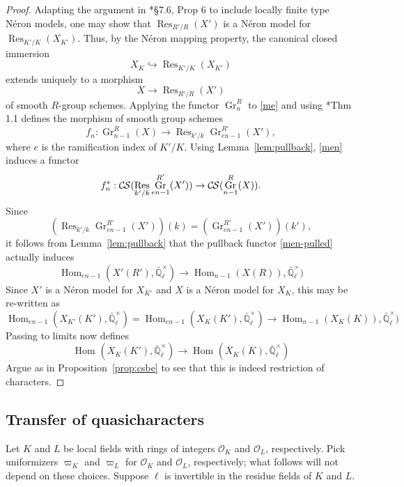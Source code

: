 \documentclass[10pt]{amsart}
\theoremstyle{plain}
\theoremstyle{definition}
\newcommand{\EE}{\mathbb{\bar Q}_\ell}
\newcommand{\OK}{\mathcal{O}_K}
\newcommand{\OL}{\mathcal{O}_L}
\newcommand{\Fq}{k}
\newcommand{\EEx}{\EE^\times}
\DeclareMathOperator{\Hom}{Hom}
\DeclareMathOperator{\Gr}{Gr}
\DeclareMathOperator{\Res}{Res}
\newcommand{\CS}{{\mathcal{C\hskip-0.8pt S}}}
\begin{document}
\begin{proof}
Adapting the argument in \cite{bosch-lutkebohmert-reynaud:NeronModels}*{\S 7.6, Prop 6} to include locally finite type N\'eron models,
one may show that $\Res_{R'/R}(X')$ is a N\'eron model for $\Res_{K'/K}(X_{K'})$.
Thus, by the N\'eron mapping property, the canonical closed immersion
\[
X_K\hookrightarrow \Res_{K'/K}(X_{K'})
\]
 extends uniquely to a morphism
\begin{equation}\label{me}
X\to \Res_{R'/R}(X')
\end{equation}
 of smooth $R$-group schemes.
%
Applying the functor $\Gr^R_{n}$ to \eqref{me}
and using \cite{bertrapelle-gonzales:Greenberg}*{Thm 1.1} defines the morphism of smooth group schemes
\begin{equation}\label{men}
f_n: \Gr_{n-1}^R(X) \to \Res_{k'/k} \Gr_{en-1}^{R'}(X'),
\end{equation}
where $e$ is the ramification index of $K'/K$.
Using Lemma~\ref{lem:pullback}, \eqref{men} induces a functor 
\begin{equation}\label{men-pulled}
f_n^* : \CS(\Res_{k'/k} \Gr_{en-1}^{R'}(X'))\to \CS(\Gr_{n-1}^{R}(X)).
\end{equation}
Since 
\[
\left(\Res_{k'/k} \Gr_{en-1}^{R'}(X') \right)(\Fq) = \left(\Gr_{en-1}^{R'}(X')\right)(k'),
\]
it follows from Lemma~\ref{lem:pullback} that the pullback functor \eqref{men-pulled} actually induces
\[ 
\Hom_{en-1}(X'(R'),\EEx) \to \Hom_{n-1}(X(R)),\EEx)
\]
Since $X'$ is a N\'eron model for $X_{K'}$ and $X$ is a N\'eron model for $X_K$,
 this may be re-written as
 \[ 
\Hom_{en-1}(X_{K'}(K'),\EEx)= \Hom_{en-1}(X_{K}(K'),\EEx) \to \Hom_{n-1}(X_K(K)),\EEx)
\]
Passing to limits now defines
\[ 
\Hom_\text{}(X_K(K'),\EEx) \to \Hom_\text{}(X_K(K),\EEx)
\]
Argue as in Proposition~\ref{prop:csbe} to see that this is indeed restriction of characters.
\end{proof}

\subsection{Transfer of quasicharacters}\label{ssec:transfer}

Let $K$ and $L$ be local fields with rings of integers $\OK$ and $\OL$, respectively. 
Pick uniformizers $\varpi_K$ and $\varpi_L$ for $\OK$ and $\OL$, respectively;
what follows will not depend on these choices.
Suppose $\ell$ is invertible in the residue fields of $K$ and $L$.
\end{document}
